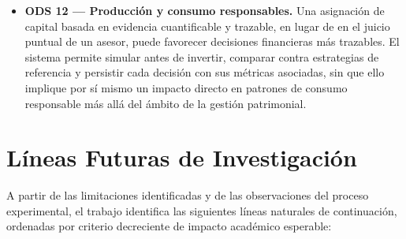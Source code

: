 \documentclass[IB,a4paper]{TFUOC}
\begin{document}
\begin{itemize}
    \item \textbf{ODS 12 — Producción y consumo responsables.} Una asignación de capital basada en evidencia cuantificable y trazable, en lugar de en el juicio puntual de un asesor, puede favorecer decisiones financieras más trazables. El sistema permite simular antes de invertir, comparar contra estrategias de referencia y persistir cada decisión con sus métricas asociadas, sin que ello implique por sí mismo un impacto directo en patrones de consumo responsable más allá del ámbito de la gestión patrimonial.
\end{itemize}

\section{Líneas Futuras de Investigación}
\label{sec:conclusiones_futuras}

A partir de las limitaciones identificadas y de las observaciones del proceso experimental, el trabajo identifica las siguientes líneas naturales de continuación, ordenadas por criterio decreciente de impacto académico esperable:
\end{document}
